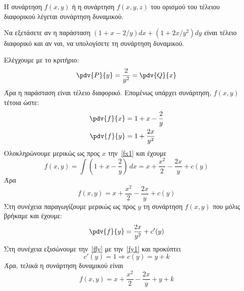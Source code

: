 \begin{rem}
  Η συνάρτηση $ f(x,y) $ ή η συνάρτηση $ f(x,y,z) $ του ορισμού του τέλειου διαφορικού
  λέγεται \textcolor{Col2}{συνάρτηση δυναμικού}.
\end{rem}

\begin{example}
  Να εξετάσετε αν η παράσταση $ \left(1+x- {2}/{y}\right)dx + 
  \left(1+ {2x}/{y^{2}} \right)dy $ είναι τέλειο διαφορικό και αν ναι, να 
  υπολογίσετε τη συνάρτηση δυναμικού.
\end{example}
\begin{solution}
  Ελέγχουμε με το κριτήριο:
  \[ 
    \pdv{P}{y} = \frac{2}{y^{2}} = \pdv{Q}{x} 
  \]
  Άρα η παράσταση είναι τέλειο διαφορικό. Επομένως υπάρχει 
  συνάρτηση, $ f(x,y) $ τέτοια ώστε: 
  \begin{align}
    \pdv{f}{x} &= 1 + x - \frac{2}{y} \label{fx1} \\
    \pdv{f}{y} &= 1+ \frac{2x}{y^{2}} \label{fy1}
  \end{align}
  Ολοκληρώνουμε μερικώς ως προς $x$ την~\eqref{fx1} και έχουμε
  \[
    f(x,y) = \int \left(1+x- \frac{2}{y}\right) \,{dx} = x + 
    \frac{x^{2}}{2} - \frac{2x}{y} + c(y) 
  \] 
  Άρα  
  \begin{equation}
    f(x,y) = x + \frac{x^{2}}{2} - \frac{2x}{y} + c(y) \label{fxy}
  \end{equation}
  Στη συνέχεια παραγωγίζουμε μερικώς ως προς $y$ τη συνάρτηση $ f(x,y) $ που μόλις 
  βρήκαμε και έχουμε:
  \begin{equation}
    \pdv{f}{y} = \frac{2x}{y^{2}} + c'(y) \label{ffy}
  \end{equation} 
  Στη συνέχεια εξισώνουμε την~\eqref{ffy} με την~\eqref{fy1} και προκύπτει
  \[
    c'(y) = 1 \Rightarrow c(y) = y + k 
  \] 
  Άρα, τελικά η συνάρτηση δυναμικού είναι 
  \[
    f(x,y) = x + \frac{x^{2}}{2} - \frac{2x}{y} + y + k 
  \] 
\end{solution}

